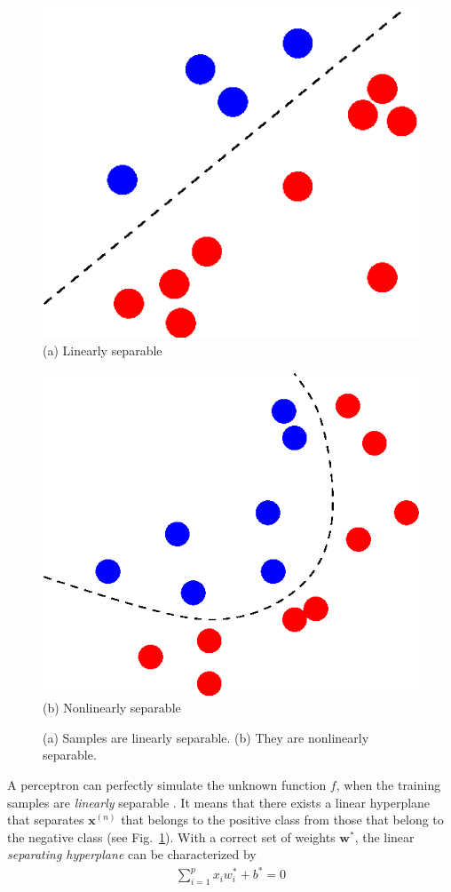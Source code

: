\documentclass[dissertation,nocontribution,draft*]{aaltoseries}
\newcommand{\vect}[1]{\mathbf{#1}}
\newcommand{\vx}[0]{\vect{x}}
\newcommand{\vw}[0]{\vect{w}}
\begin{document}
\begin{figure}[t]
    \begin{minipage}{0.48\textwidth}
        \centering
        \includegraphics[width=0.75\columnwidth]{figures/linsep.eps}
        \\
        \small
        (a) Linearly separable
    \end{minipage}
    \begin{minipage}{0.48\textwidth}
        \centering
        \includegraphics[width=0.75\columnwidth]{figures/nonlinsep.eps}
        \\
        \small
        (b) Nonlinearly separable
    \end{minipage}
    \caption{(a)
    Samples are linearly separable. (b) They are
    nonlinearly separable.}
    \label{fig:linsep}
\end{figure}

A perceptron can perfectly simulate the unknown function
$f$, when the training samples are \textit{linearly}
separable \citep[see, e.g.,][]{Haykin2009}.  It means that
there exists a linear hyperplane that separates $\vx^{(n)}$
that belongs to the positive class from those that belong to
the negative class (see Fig.~\ref{fig:linsep}). With a
correct set of weights $\vw^*$, the linear
\textit{separating hyperplane} can be characterized by
\begin{align*}
    \sum_{i=1}^p x_i w_i^* + b^* = 0
\end{align*}
\end{document}
